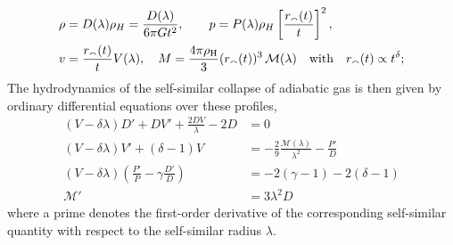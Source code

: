 \begin{align*}
\rho &= D(\lambda ) \rho_H = \frac{D(\lambda )}{6 \pi G t^2}, \qquad
p = P(\lambda ) \rho_H \left[ \frac{r_{\smallfrown}(t)}{t} \right]^2,\\
v &= \frac{r_{\smallfrown}(t)}{t} V(\lambda ), \quad M = \frac{4\pi \rho _{\rm H}}{3} (r_{\smallfrown}(t))^3\,\mathcal{M}(\lambda)\quad  \text{with} \quad r_{\smallfrown}(t) \propto t^{\delta};
\end{align*}
The hydrodynamics of the self-similar collapse of adiabatic gas is then given by ordinary differential equations over these  profiles,
\begin{align}
\label{eq:selfsim-sph_hydro_cont-ch:ssr}
(V-\delta \lambda) D' + DV' + \frac{2 D V}{\lambda} - 2D &= 0\\
\label{eq:selfsim-sph_hydro_accl-ch:ssr}
(V-\delta \lambda) V' + (\delta -1 ) V &= - \frac{2}{9} \frac{\mathcal{M}(\lambda)}{\lambda^2 } - \frac{P'}{D}\\
\label{eq:selfsim-sph_hydro_adiab-ch:ssr}
(V-\delta \lambda) \left( \frac{P'}{P} - \gamma \frac{D'}{D} \right) &= -2 (\gamma - 1) - 2 (\delta -1)\\
\label{eq:selfsim-sph_hydro_mass_cons-ch:ssr}
\mathcal{M}' &= 3 \lambda^2 D
\end{align}
where a prime denotes the first-order derivative of the corresponding self-similar quantity with respect to the self-similar radius $\lambda$.

